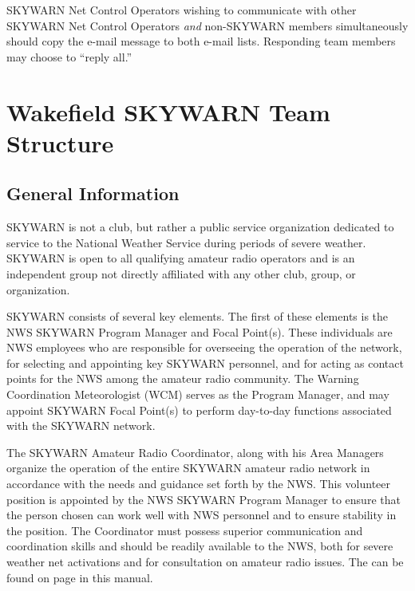 \documentclass[pdflatex,letterpaper,twoside,12pt]{book}
\begin{document}
SKYWARN Net Control Operators wishing to communicate with other SKYWARN Net Control Operators \emph{and} non-SKYWARN \tpteam members simultaneously should copy the e-mail message to both e-mail lists.  Responding team members may choose to ``reply all.''


\chapter{Wakefield SKYWARN Team Structure}


\section{General Information}

SKYWARN is not a club, but rather a public service organization dedicated to service to the National Weather Service during periods of severe weather. SKYWARN is open to all qualifying amateur radio operators and is an independent group not directly affiliated with any other club, group, or organization.

SKYWARN consists of several key elements.  The first of these elements is the NWS SKYWARN Program Manager and Focal Point(s).  These individuals are NWS employees who are responsible for overseeing the operation of the network, for selecting and appointing key SKYWARN personnel, and for acting as contact points for the NWS among the amateur radio community.  The Warning Coordination Meteorologist (WCM) serves as the Program Manager, and may appoint SKYWARN Focal Point(s) to perform day-to-day functions associated with the SKYWARN network.

The SKYWARN Amateur Radio Coordinator, along with his Area Managers organize the operation of the entire SKYWARN amateur radio network in accordance with the needs and guidance set forth by the NWS.  This volunteer position is appointed by the NWS SKYWARN Program Manager to ensure that the person chosen can work well with NWS personnel and to ensure stability in the position.  The Coordinator must possess superior communication and coordination skills and should be readily available to the NWS, both for severe weather net activations and for consultation on amateur radio issues.  The  can be found on page \pageref{arc-jobdesc} in this manual.
\end{document}
